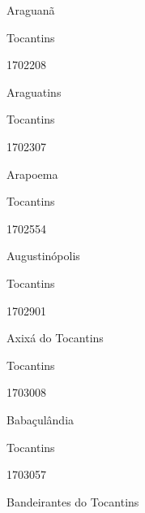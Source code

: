 \documentclass[
  letterpaper,
]{report}
\begin{document}
Araguanã

\n    

\n    

\n      

Tocantins

\n      

1702208

\n      

Araguatins

\n    

\n    

\n      

Tocantins

\n      

1702307

\n      

Arapoema

\n    

\n    

\n      

Tocantins

\n      

1702554

\n      

Augustinópolis

\n    

\n    

\n      

Tocantins

\n      

1702901

\n      

Axixá do Tocantins

\n    

\n    

\n      

Tocantins

\n      

1703008

\n      

Babaçulândia

\n    

\n    

\n      

Tocantins

\n      

1703057

\n      

Bandeirantes do Tocantins

\n    

\n    

\n      
\end{document}
